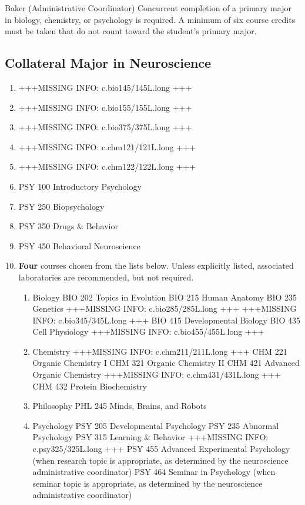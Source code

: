 \documentclass[
  letterpaper,
]{scrbook}
\providecommand{\tightlist}{%
  \setlength{\itemsep}{0pt}\setlength{\parskip}{0pt}}
\begin{document}
Baker (Administrative Coordinator) Concurrent completion of a primary
major in biology, chemistry, or psychology is required. A minimum of six
course credits must be taken that do not count toward the student's
primary major.

\subsection{Collateral Major in
Neuroscience}\label{collateral-major-in-neuroscience}

\begin{enumerate}
\def\labelenumi{\arabic{enumi}.}
\tightlist
\item
  +++MISSING INFO: c.bio145/145L.long +++
\item
  +++MISSING INFO: c.bio155/155L.long +++
\item
  +++MISSING INFO: c.bio375/375L.long +++
\item
  +++MISSING INFO: c.chm121/121L.long +++
\item
  +++MISSING INFO: c.chm122/122L.long +++
\item
  PSY 100 Introductory Psychology
\item
  PSY 250 Biopsychology
\item
  PSY 350 Drugs \& Behavior
\item
  PSY 450 Behavioral Neuroscience
\item
  \textbf{Four} courses chosen from the lists below. Unless explicitly
  listed, associated laboratories are recommended, but not required.

  \begin{enumerate}
  \def\labelenumii{\alph{enumii}.}
  \tightlist
  \item
    Biology BIO 202 Topics in Evolution BIO 215 Human Anatomy BIO 235
    Genetics +++MISSING INFO: c.bio285/285L.long +++ +++MISSING INFO:
    c.bio345/345L.long +++ BIO 415 Developmental Biology BIO 435 Cell
    Physiology +++MISSING INFO: c.bio455/455L.long +++
  \item
    Chemistry +++MISSING INFO: c.chm211/211L.long +++ CHM 221 Organic
    Chemistry I CHM 321 Organic Chemistry II CHM 421 Advanced Organic
    Chemistry +++MISSING INFO: c.chm431/431L.long +++ CHM 432 Protein
    Biochemistry
  \item
    Philosophy PHL 245 Minds, Brains, and Robots
  \item
    Psychology PSY 205 Developmental Psychology PSY 235 Abnormal
    Psychology PSY 315 Learning \& Behavior +++MISSING INFO:
    c.psy325/325L.long +++ PSY 455 Advanced Experimental Psychology
    (when research topic is appropriate, as determined by the
    neuroscience administrative coordinator) PSY 464 Seminar in
    Psychology (when seminar topic is appropriate, as determined by the
    neuroscience administrative coordinator)
  \end{enumerate}
\end{enumerate}
\end{document}
